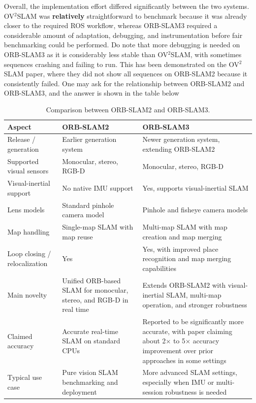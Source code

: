 \documentclass[11pt]{article}
\begin{document}
Overall, the implementation effort differed significantly between the two systems. OV$^{2}$SLAM was \textbf{relatively} straightforward to benchmark because it was already closer to the required ROS workflow, whereas ORB-SLAM3 required a considerable amount of adaptation, debugging, and instrumentation before fair benchmarking could be performed. Do note that more debugging is needed on ORB-SLAM3 as it is considerably less stable than OV$^{2}$SLAM, with sometimes sequences crashing and failing to run. This has been demonstrated on the OV$^{2}$SLAM paper, where they did not show all sequences on ORB-SLAM2 because it consistently failed. One may ask for the relationship between ORB-SLAM2 and ORB-SLAM3, and the answer is
shown in the table below
\begin{table}[ht]
\centering
\caption{Comparison between ORB-SLAM2 and ORB-SLAM3.}
\label{tab:orbslam2_vs_orbslam3}
\renewcommand{\arraystretch}{1.2}
\setlength{\tabcolsep}{5pt}
\begin{tabular}{p{3.2cm}p{5.2cm}p{5.2cm}}
\toprule
\textbf{Aspect} & \textbf{ORB-SLAM2} & \textbf{ORB-SLAM3} \\
\midrule
Release / generation
& Earlier generation system
& Newer generation system, extending ORB-SLAM2 \\
\midrule
Supported visual sensors
& Monocular, stereo, RGB-D
& Monocular, stereo, RGB-D \\
\midrule
Visual-inertial support
& No native IMU support
& Yes, supports visual-inertial SLAM \\
\midrule
Lens models
& Standard pinhole camera model
& Pinhole and fisheye camera models \\
\midrule
Map handling
& Single-map SLAM with map reuse
& Multi-map SLAM with map creation and map merging \\
\midrule
Loop closing / relocalization
& Yes
& Yes, with improved place recognition and map merging capabilities \\
\midrule
Main novelty
& Unified ORB-based SLAM for monocular, stereo, and RGB-D in real time
& Extends ORB-SLAM2 with visual-inertial SLAM, multi-map operation, and stronger robustness \\
\midrule
Claimed accuracy
& Accurate real-time SLAM on standard CPUs
& Reported to be significantly more accurate, with paper claiming about 2$\times$ to 5$\times$ accuracy improvement over prior approaches in some settings \\
\midrule
Typical use case
& Pure vision SLAM benchmarking and deployment
& More advanced SLAM settings, especially when IMU or multi-session robustness is needed \\
\bottomrule
\end{tabular}
\end{table}
\end{document}
